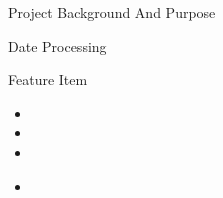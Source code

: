 \documentclass[
 size=14pt,
 paper=smartboard,  %
 mode=present, 		%
 display=slides, 	%
 style=tuliplab,  	%
 pauseslide,
 fleqn,leqno]{powerdot}
\providecommand{\DIFdeltex}[1]{{\protect\color{red}\sout{#1}}}                      %
\providecommand{\DIFdelbegin}{} %
\providecommand{\DIFdelend}{} %
\providecommand{\DIFdel}[1]{\texorpdfstring{\DIFdeltex{#1}}{}} %
\newcommand{\DIFscaledelfig}{0.5}
\newlength{\DIFdelgraphicswidth} %
\newlength{\DIFdelgraphicsheight} %
\newcommand{\DIFdelincludegraphics}[2][]{%
\sbox{\DIFdelgraphicsbox}{\DIFOincludegraphics[#1]{#2}}%
\settoboxwidth{\DIFdelgraphicswidth}{\DIFdelgraphicsbox} %
\settoboxtotalheight{\DIFdelgraphicsheight}{\DIFdelgraphicsbox} %
\scalebox{\DIFscaledelfig}{%
\parbox[b]{\DIFdelgraphicswidth}{\usebox{\DIFdelgraphicsbox}\\[-\baselineskip] \rule{\DIFdelgraphicswidth}{0em}}\llap{\resizebox{\DIFdelgraphicswidth}{\DIFdelgraphicsheight}{%
\setlength{\unitlength}{\DIFdelgraphicswidth}%
\begin{picture}(1,1)%
\thicklines\linethickness{2pt} %
{\color[rgb]{1,0,0}\put(0,0){\framebox(1,1){}}}%
{\color[rgb]{1,0,0}\put(0,0){\line( 1,1){1}}}%
{\color[rgb]{1,0,0}\put(0,1){\line(1,-1){1}}}%
\end{picture}%
}\hspace*{3pt}}} %
} %
\DeclareRobustCommand{\DIFdelbegin}{\DIFOdelbegin \let\includegraphics\DIFdelincludegraphics} %
\DeclareRobustCommand{\DIFdelend}{\DIFOaddend \let\includegraphics\DIFOincludegraphics} %
\begin{document}
\begin{slide}
\begin{slide}{Project Background And Purpose}
\begin{slide}{Date Processing}
\begin{slide}{Feature Item}
\DIFdelbegin %
\DIFdelend \bigskip
\DIFdelbegin %
\begin{itemize}%
\item%

\item%

\item%

\end{itemize}%
\begin{itemize}%
\item%


\end{itemize}
\end{slide}
\end{slide}
\end{slide}
\end{slide}
\end{document}

